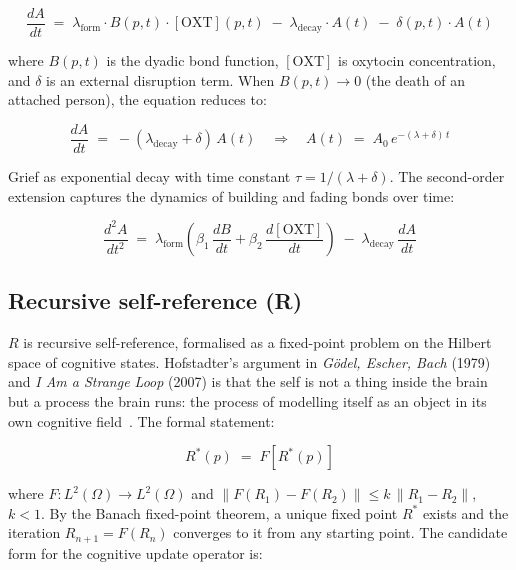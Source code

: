 \documentclass[12pt, a4paper]{article}
\begin{document}
\begin{equation}
\frac{dA}{dt} \;=\; \lambda_{\mathrm{form}} \cdot B(p,t) \cdot [\mathrm{OXT}](p,t)
               \;-\; \lambda_{\mathrm{decay}} \cdot A(t)
               \;-\; \delta(p,t) \cdot A(t)
\end{equation}

where $B(p,t)$ is the dyadic bond function, $[\mathrm{OXT}]$ is oxytocin concentration, and $\delta$
is an external disruption term. When $B(p,t) \to 0$ (the death of an attached person), the equation
reduces to:

\begin{equation}
\frac{dA}{dt} \;=\; -(\lambda_{\mathrm{decay}} + \delta)\,A(t)
\quad\Longrightarrow\quad
A(t) \;=\; A_0\,e^{-(\lambda+\delta)\,t}
\end{equation}

Grief as exponential decay with time constant $\tau = 1/(\lambda+\delta)$. The second-order extension
captures the dynamics of building and fading bonds over time:

\begin{equation}
\frac{d^2A}{dt^2} \;=\; \lambda_{\mathrm{form}}\!\left(\beta_1\,\frac{dB}{dt}
    + \beta_2\,\frac{d[\mathrm{OXT}]}{dt}\right)
    \;-\; \lambda_{\mathrm{decay}}\,\frac{dA}{dt}
\end{equation}

\subsection*{Recursive self-reference (R)}

$R$ is recursive self-reference, formalised as a fixed-point problem on the Hilbert space of
cognitive states. Hofstadter's argument in \textit{G\"{o}del, Escher, Bach} (1979) and \textit{I Am
a Strange Loop} (2007) is that the self is not a thing inside the brain but a process the brain runs:
the process of modelling itself as an object in its own cognitive field~\cite{Alg-4,Alg-5}. The
formal statement:

\begin{equation}
R^*(p) \;=\; F[R^*(p)]
\end{equation}

where $F: L^2(\Omega) \to L^2(\Omega)$ and $\|F(R_1) - F(R_2)\| \leq k\,\|R_1 - R_2\|$,\; $k < 1$.
By the Banach fixed-point theorem, a unique fixed point $R^*$ exists and the iteration
$R_{n+1} = F(R_n)$ converges to it from any starting point. The candidate form for the cognitive
update operator is:
\end{document}
